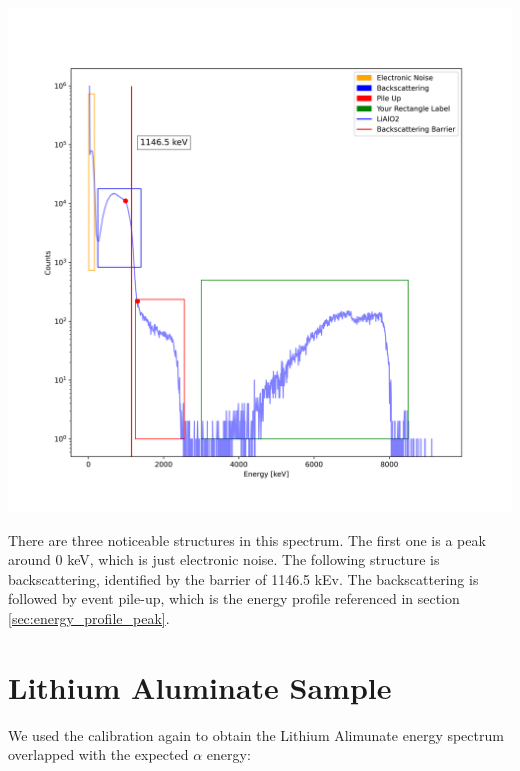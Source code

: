 \documentclass{article}
\begin{document}
\begin{multicols}{2}
\begin{center}
    \label{TT_21}
    \centering
    \includegraphics[scale = 0.4]{../../images/FullAnalysisLiF.png}
\end{center}

There are three noticeable structures in this spectrum. 
The first one is a peak around 0 keV, which is just electronic noise. The following structure is backscattering, identified by the barrier of 1146.5 kEv. 
The backscattering is followed by event pile-up, which is the energy profile referenced in section \ref{sec:energy_profile_peak}.



\section{ Lithium Aluminate Sample}

We used the calibration again to obtain the Lithium Alimunate energy spectrum overlapped with the expected $\alpha$ energy:


\end{multicols}
\end{document}
